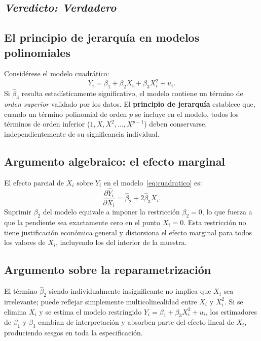 \documentclass[12pt, letterpaper]{article}
\begin{document}
\subsection*{\textit{Veredicto: \textbf{Verdadero}}}

\subsection{El principio de jerarquía en modelos polinomiales}

Considérese el modelo cuadrático:
\begin{equation}
  Y_i = \beta_1 + \beta_2 X_i + \beta_3 X_i^2 + u_i.
  \label{eq:cuadratico}
\end{equation}
Si $\hat{\beta}_3$ resulta estadísticamente significativo, el modelo
contiene un término de \emph{orden superior} validado por los datos.
El \textbf{principio de jerarquía} establece que, cuando un término
polinomial de orden $p$ se incluye en el modelo, todos los términos
de orden inferior ($1, X, X^2, \ldots, X^{p-1}$) deben conservarse,
independientemente de su significancia individual.

\subsection{Argumento algebraico: el efecto marginal}

El efecto parcial de $X_i$ sobre $Y_i$ en el modelo~\eqref{eq:cuadratico}
es:
\begin{equation}
  \frac{\partial \hat{Y}_i}{\partial X_i}
  = \hat{\beta}_2 + 2\hat{\beta}_3 X_i.
  \label{eq:efecto_marginal}
\end{equation}
Suprimir $\beta_2$ del modelo equivale a imponer la restricción
$\beta_2 = 0$, lo que fuerza a que la pendiente sea exactamente cero
en el punto $X_i = 0$. Esta restricción no tiene justificación
económica general y distorsiona el efecto marginal para todos los
valores de $X_i$, incluyendo los del interior de la muestra.

\subsection{Argumento sobre la reparametrización}

El término $\hat{\beta}_2$ siendo individualmente insignificante no
implica que $X_i$ sea irrelevante; puede reflejar simplemente
multicolinealidad entre $X_i$ y $X_i^2$. Si se elimina $X_i$ y se
estima el modelo restringido $Y_i = \beta_1 + \beta_3 X_i^2 + u_i$,
los estimadores de $\beta_1$ y $\beta_3$ cambian de interpretación y
absorben parte del efecto lineal de $X_i$, produciendo sesgos en toda
la especificación.
\end{document}
